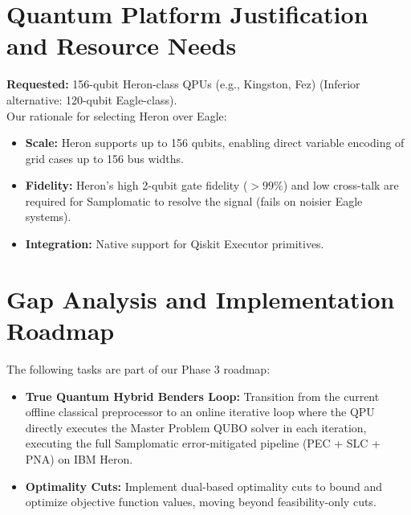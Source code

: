 \documentclass[11pt]{article}
\begin{document}
\section{Quantum Platform Justification and Resource Needs}
\textbf{Requested:} 156-qubit Heron-class QPUs (e.g., Kingston, Fez) (Inferior alternative: 120-qubit Eagle-class).\\
Our rationale for selecting Heron over Eagle:
\begin{itemize}[leftmargin=*,noitemsep,topsep=0pt]
  \item \textbf{Scale:} Heron supports up to 156 qubits, enabling direct variable encoding of grid cases up to 156 bus widths.
  \item \textbf{Fidelity:} Heron's high 2-qubit gate fidelity ($> 99\%$) and low cross-talk are required for Samplomatic to resolve the signal (fails on noisier Eagle systems).
  \item \textbf{Integration:} Native support for Qiskit Executor primitives.
\end{itemize}

\section{Gap Analysis and Implementation Roadmap}
The following tasks are part of our Phase 3 roadmap:
\begin{itemize}[leftmargin=*,noitemsep,topsep=0pt]
  \item \textbf{True Quantum Hybrid Benders Loop:} Transition from the current offline classical preprocessor to an online iterative loop where the QPU directly executes the Master Problem QUBO solver in each iteration, executing the full Samplomatic error-mitigated pipeline (PEC + SLC + PNA) on IBM Heron.
  \item \textbf{Optimality Cuts:} Implement dual-based optimality cuts to bound and optimize objective function values, moving beyond feasibility-only cuts.
\end{itemize}

\newpage


\end{document}
